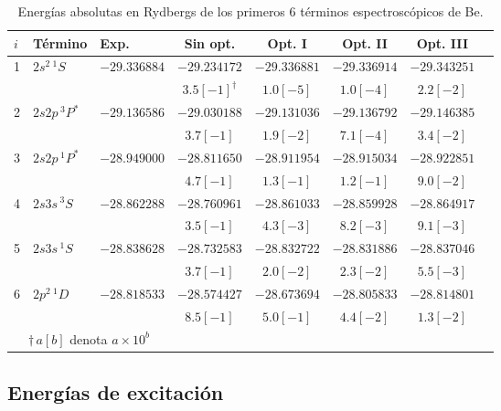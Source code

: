 \begin{table}
\centering
\begin{tabular}{|lll|ccccc|}
\hline 
$i$&Término & Exp.~\cite{NIST} & Sin opt.   & Opt. I       & Opt. II      & Opt. III \\
\hline 
\hline 
1&$2s^2\,^1S$   & $-29.336884$ & $-29.234172$ & $-29.336881$ & $-29.336914$ & $-29.343251$ \\
 &              &              & $3.5[-1]^\dagger$ & $1.0[-5]$ & $1.0[-4]$    & $2.2[-2]$ \\
2&$2s2p\,^3P^*$ & $-29.136586$ & $-29.030188$ & $-29.131036$ & $-29.136792$ & $-29.146385$ \\
 &              &              & $3.7[-1]$    & $1.9[-2]$    & $7.1[-4]$    & $3.4[-2]$ \\
3&$2s2p\,^1P^*$ & $-28.949000$ & $-28.811650$ & $-28.911954$ & $-28.915034$ & $-28.922851$ \\
 &              &              & $4.7[-1]$    & $1.3[-1]$    & $1.2[-1]$    & $9.0[-2]$ \\
4&$2s3s\,^3S$   & $-28.862288$ & $-28.760961$ & $-28.861033$ & $-28.859928$ & $-28.864917$ \\
 &              &              & $3.5[-1]$    & $4.3[-3]$    & $8.2[-3]$    & $9.1[-3]$ \\
5&$2s3s\,^1S$   & $-28.838628$ & $-28.732583$ & $-28.832722$ & $-28.831886$ & $-28.837046$ \\
 &              &              & $3.7[-1]$    & $2.0[-2]$    & $2.3[-2]$    & $5.5[-3]$ \\
6&$2p^2\,^1D$   & $-28.818533$ & $-28.574427$ & $-28.673694$ & $-28.805833$ & $-28.814801$ \\
 &              &              & $8.5[-1]$    & $5.0[-1]$    & $4.4[-2]$    & $1.3[-2]$ \\
\hline
\multicolumn{3}{c}{$\dagger\,a[b]$ denota $a\times 10^b$} \\
\end{tabular}
\caption[Energías absolutas de Be.]
{Energías absolutas en Rydbergs de los primeros 6 términos espectroscópicos 
de Be.}
\label{tab:optpol}
\end{table}


\subsection{Energías de excitación}

